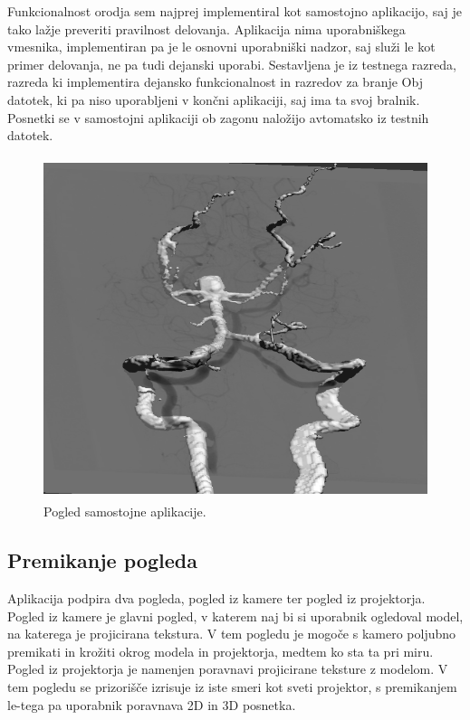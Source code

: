 \documentclass[a4paper, 12pt]{book}
\begin{document}
Funkcionalnost orodja sem najprej implementiral kot samostojno aplikacijo, saj je tako lažje preveriti pravilnost delovanja. Aplikacija nima uporabniškega vmesnika, implementiran pa je le osnovni uporabniški nadzor, saj služi le kot primer delovanja, ne pa tudi dejanski uporabi. Sestavljena je iz testnega razreda, razreda ki implementira dejansko funkcionalnost in razredov za branje Obj datotek, ki pa niso uporabljeni v končni aplikaciji, saj ima ta svoj bralnik. Posnetki se v samostojni aplikaciji ob zagonu naložijo avtomatsko iz testnih datotek.

\begin{figure}[h]
\begin{center}
\includegraphics[width=12cm, height=10cm, keepaspectratio=true]{Samostojna_aplikacija.png}
\end{center}
\caption{Pogled samostojne aplikacije.}
\label{samostojnaaplikacija}
\end{figure}

\subsection*{Premikanje pogleda}

Aplikacija podpira dva pogleda, pogled iz kamere ter pogled iz projektorja. Pogled iz kamere je glavni pogled, v katerem naj bi si uporabnik ogledoval model, na katerega je projicirana tekstura. V tem pogledu je mogoče s kamero poljubno premikati in krožiti okrog modela in projektorja, medtem ko sta ta pri miru. Pogled iz projektorja je namenjen poravnavi projicirane teksture z modelom. V tem pogledu se prizorišče izrisuje iz iste smeri kot sveti projektor, s premikanjem le-tega pa uporabnik poravnava 2D in 3D posnetka.
\end{document}
